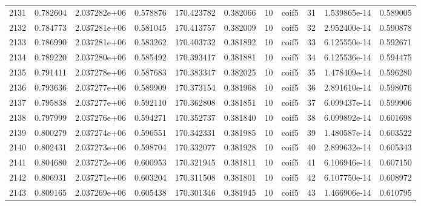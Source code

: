 \begin{tabular}{lrrrrrrlrrr}
2131 &    0.782604 &        2.037282e+06 &  0.578876 &              170.423782 &    0.382066 &      10 &        coif5 &     31 &   1.539865e-14 &      0.589005 \\
2132 &    0.784773 &        2.037281e+06 &  0.581045 &              170.413757 &    0.382009 &      10 &        coif5 &     32 &   2.952400e-14 &      0.590878 \\
2133 &    0.786990 &        2.037281e+06 &  0.583262 &              170.403732 &    0.381892 &      10 &        coif5 &     33 &   6.125550e-14 &      0.592671 \\
2134 &    0.789220 &        2.037280e+06 &  0.585492 &              170.393417 &    0.381881 &      10 &        coif5 &     34 &   6.125536e-14 &      0.594475 \\
2135 &    0.791411 &        2.037278e+06 &  0.587683 &              170.383347 &    0.382025 &      10 &        coif5 &     35 &   1.478409e-14 &      0.596280 \\
2136 &    0.793636 &        2.037277e+06 &  0.589909 &              170.373154 &    0.381968 &      10 &        coif5 &     36 &   2.891610e-14 &      0.598076 \\
2137 &    0.795838 &        2.037277e+06 &  0.592110 &              170.362808 &    0.381851 &      10 &        coif5 &     37 &   6.099437e-14 &      0.599906 \\
2138 &    0.797999 &        2.037276e+06 &  0.594271 &              170.352737 &    0.381840 &      10 &        coif5 &     38 &   6.099892e-14 &      0.601698 \\
2139 &    0.800279 &        2.037274e+06 &  0.596551 &              170.342331 &    0.381985 &      10 &        coif5 &     39 &   1.480587e-14 &      0.603522 \\
2140 &    0.802431 &        2.037273e+06 &  0.598704 &              170.332077 &    0.381928 &      10 &        coif5 &     40 &   2.899632e-14 &      0.605343 \\
2141 &    0.804680 &        2.037272e+06 &  0.600953 &              170.321945 &    0.381811 &      10 &        coif5 &     41 &   6.106946e-14 &      0.607150 \\
2142 &    0.806931 &        2.037271e+06 &  0.603204 &              170.311508 &    0.381801 &      10 &        coif5 &     42 &   6.107750e-14 &      0.608972 \\
2143 &    0.809165 &        2.037269e+06 &  0.605438 &              170.301346 &    0.381945 &      10 &        coif5 &     43 &   1.466906e-14 &      0.610795 \\

\end{tabular}
